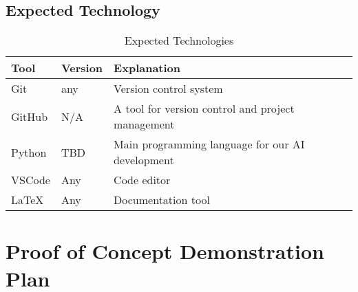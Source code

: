 \documentclass{article}
\begin{document}
\subsection{Expected Technology}



\begin{table}[h!]
    \centering
    \begin{tabular}{|l|l|l|}
    \hline
    \textbf{Tool}   & \textbf{Version} & \textbf{Explanation }                                         \\
    \hline
    Git   & any  & Version control system                                   \\
    \hline
    GitHub & N/A     & A tool for version control and project management    \\
    \hline
    Python & TBD     & Main programming language for our AI development     \\
    \hline
    VSCode & Any     & Code editor                                          \\
    \hline              
    LaTeX  & Any     & Documentation tool                                   \\
    \hline
    \end{tabular}
    \caption{Expected Technologies}
\end{table}

\section{Proof of Concept Demonstration Plan}
\end{document}
